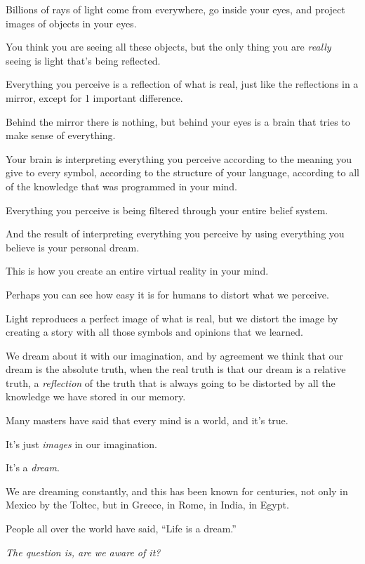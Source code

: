 \documentclass{article}
\numberwithin{equation}{section}
\begin{document}
Billions of rays of light come from everywhere, go inside your eyes, and project images of objects in your eyes.

You think you are seeing all these objects, but the only thing you are \textit{really} seeing is light that's being reflected.

%
Everything you perceive is a reflection of what is real, just like the reflections in a mirror, except for 1 important difference.

Behind the mirror there is nothing, but behind your eyes is a brain that tries to make sense of everything.

Your brain is interpreting everything you perceive according to the meaning you give to every symbol, according to the structure of your language, according to all of the knowledge that was programmed in your mind.

Everything you perceive is being filtered through your entire belief system.

And the result of interpreting everything you perceive by using everything you believe is your personal dream.

This is how you create an entire virtual reality in your mind.

%
Perhaps you can see how easy it is for humans to distort what we perceive.

Light reproduces a perfect image of what is real, but we distort the image by creating a story with all those symbols and opinions that we learned.

We dream about it with our imagination, and by agreement we think that our dream is the absolute truth, when the real truth is that our dream is a relative truth, a \textit{reflection} of the truth that is always going to be distorted by all the knowledge we have stored in our memory.

%
Many masters have said that every mind is a world, and it's true.


It's just \textit{images} in our imagination.

It's a \textit{dream}.

We are dreaming constantly, and this has been known for centuries, not only in Mexico by the Toltec, but in Greece, in Rome, in India, in Egypt.

People all over the world have said, ``Life is a dream.''

\textit{The question is, are we aware of it?}
\end{document}
